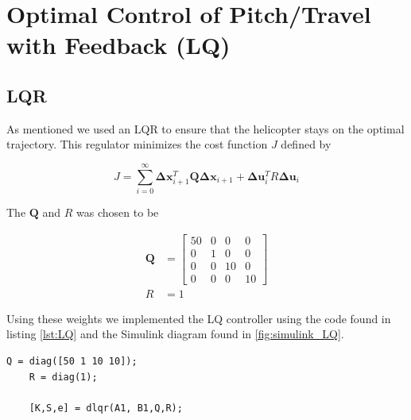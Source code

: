 
\section{Optimal Control of Pitch/Travel with Feedback (LQ)}
\subsection{LQR}


As mentioned we used an LQR to ensure that the helicopter stays on the optimal trajectory. This regulator minimizes the cost function $J$ defined by

\begin{equation}
    J = \sum^{\infty}_{i=0} \mathbf{\Delta} \mathbf{x}^T_{i+1}\mathbf{Q}\mathbf{\Delta} \mathbf{x}_{i+1}+\mathbf{\Delta} \mathbf{u}_i^T R \mathbf{\Delta} \mathbf{u}_i
\end{equation}

The $\mathbf{Q}$ and $R$ was chosen to be

\begin{subequations}
    \begin{align}
        \mathbf{Q} &= \begin{bmatrix}
            50 & 0 & 0 & 0\\
            0 & 1 & 0 & 0 \\
            0 & 0 & 10 & 0\\
            0 & 0 & 0 & 10
        \end{bmatrix}\\
        R &= 1
    \end{align}
\end{subequations}

Using these weights we implemented the LQ controller using the code found in listing \ref{lst:LQ} and the Simulink diagram found in \cref{fig:simulink_LQ}.

\begin{lstlisting}[caption={MATLAB code for LQ controller},label=lst:LQ]
    Q = diag([50 1 10 10]);
    R = diag(1);

    [K,S,e] = dlqr(A1, B1,Q,R);
\end{lstlisting}

